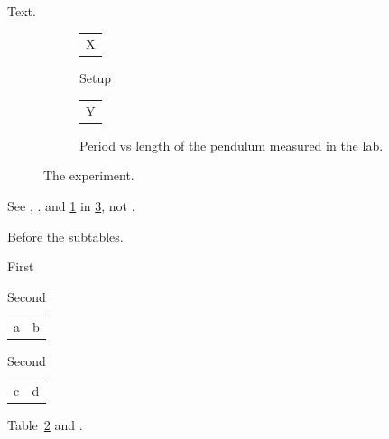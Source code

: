 \documentclass{article}
\begin{document}
Text.
\begin{figure}[h]
\centering
\begin{subfigure}{0.45\textwidth}
\centering
\begin{tabular}{c}X\end{tabular}
\caption{Setup}
\label{fig:s}
\end{subfigure}
\begin{subfigure}{0.45\textwidth}
\begin{tabular}{c}Y\end{tabular}
\caption{Period vs length of the pendulum measured in the lab.}\label{fig:p}
\end{subfigure}
\caption{The experiment.}
\label{fig:e}
\end{figure}
See , . and \ref{fig:s} in \ref{fig:e}, not .
\begin{table}[h]
\caption{Before the subtables.}
\begin{subtable}{0.3\textwidth}
\caption{First}\label{tab:a}
\begin{tabular}{ll}a & b\\\end{tabular}
\end{subtable}
\hfill
\begin{subtable}[b]{0.3\textwidth}
\begin{tabular}{ll}c & d\\\end{tabular}
\caption{Second}
\end{subtable}
\end{table}
Table~\ref{tab:a} and .
\end{document}
